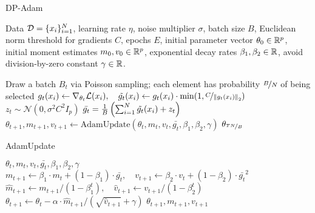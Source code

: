 \vspace{-2mm}
\begin{algorithm}[H]\label{algo:dp_adam}
\centering
\caption{DP-Adam}
\begin{algorithmic}[1]
  Data $\mathcal{D}=\{x_i\}_{i=1}^N$, learning rate $\eta$, noise multiplier $\sigma$, batch size $B$, Euclidean norm threshold for gradients $C$, epochs $E$, initial parameter vector $\theta_0\in\mathbb{R}^p$, initial moment estimates $m_0, v_0 \in \mathbb{R}^p$,
  exponential decay rates $\beta_1, \beta_2 \in \mathbb{R}$,
  avoid division-by-zero constant $\gamma\in \mathbb{R}$.


    \State Draw a batch $B_t$ via Poisson sampling; each element has probability $\nicefrac{B}{N}$ of being selected
        \State
        $
        g_t(x_i) \gets \nabla_{\theta_t} \mathcal{L}(x_i), \quad
        \tilde{g_t}(x_i) \gets g_t(x_i) \cdot \min(1, \nicefrac{C}{ \left\lVert g_t(x_i)\right\rVert_2 })
        $
    \EndFor
    \State $z_t \sim \mathcal{N}(0, \sigma^2 C^2 I_p)$
    \State $\bar{g_t} = \frac{1}{B} \left( 
        \sum_{i=1}^N \tilde{g_t}(x_i) + z_t
    \right)$
    \State $\theta_{t + 1}, m_{t+1}, v_{t+1} \gets \text{AdamUpdate}(\theta_t, m_{t}, v_{t}, \bar{g_t}, \beta_1, \beta_2, \gamma)$
    \EndFor
\State \Return $\theta_{\nicefrac{TN}{B}}$
\end{algorithmic}
\end{algorithm}

\vspace{-6mm}
\begin{algorithm}[H]\label{algo:adam_update}
\centering
\caption{AdamUpdate}
\begin{algorithmic}[1]
  $\theta_t, m_t, v_t, \bar{g_t}, \beta_1, \beta_2, \gamma$ 
  \State
  $
  m_{t+1} \leftarrow
    \beta_{1} \cdot m_{t} + \left(1-\beta_{1}\right) \cdot \bar{g_t}, \quad 
  v_{t+1} \leftarrow
    \beta_{2} \cdot v_{t}+\left(1-\beta_{2}\right) \cdot \bar{g_t}^{2}
  $
  \State
  $
  \widehat{m}_{t+1} \leftarrow m_{t+1} /\left(1-\beta_{1}^{t}\right), \quad
  \widehat{v}_{t+1} \leftarrow v_{t+1} /\left(1-\beta_{2}^{t}\right)
  $
  \State
  $
  \theta_{t+1} \leftarrow \theta_{t}-\alpha \cdot \widehat{m}_{t+1} /\left(\sqrt{\widehat{v}_{t+1}}+\gamma\right)
  $
  \State  \Return $\theta_{t+1}, m_{t +1}, v_{t + 1}$
\end{algorithmic}
\end{algorithm}


